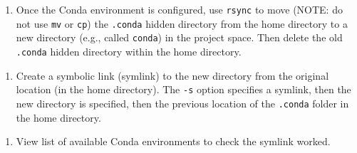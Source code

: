 \documentclass[]{book}
\newenvironment{Shaded}{\begin{snugshade}}{\end{snugshade}}
\newcommand{\StringTok}[1]{\textcolor[rgb]{0.31,0.60,0.02}{#1}}
\newcommand{\OperatorTok}[1]{\textcolor[rgb]{0.81,0.36,0.00}{\textbf{#1}}}
\newcommand{\ErrorTok}[1]{\textcolor[rgb]{0.64,0.00,0.00}{\textbf{#1}}}
\newcommand{\NormalTok}[1]{#1}
\providecommand{\tightlist}{%
  \setlength{\itemsep}{0pt}\setlength{\parskip}{0pt}}
\begin{document}
\begin{enumerate}
\def\labelenumi{\arabic{enumi}.}
\setcounter{enumi}{4}
\tightlist
\item
  Once the Conda environment is configured, use \texttt{rsync} to move
  (NOTE: do not use \texttt{mv} or \texttt{cp}) the \texttt{.conda}
  hidden directory from the home directory to a new directory (e.g.,
  called \texttt{conda}) in the project space. Then delete the old
  \texttt{.conda} hidden directory within the home directory.
\end{enumerate}

\begin{Shaded}
\end{Shaded}

\begin{enumerate}
\def\labelenumi{\arabic{enumi}.}
\setcounter{enumi}{5}
\tightlist
\item
  Create a symbolic link (symlink) to the new directory from the
  original location (in the home directory). The \texttt{-s} option
  specifies a symlink, then the new directory is specified, then the
  previous location of the \texttt{.conda} folder in the home directory.
\end{enumerate}

\begin{Shaded}
\end{Shaded}

\begin{enumerate}
\def\labelenumi{\arabic{enumi}.}
\setcounter{enumi}{6}
\tightlist
\item
  View list of available Conda environments to check the symlink worked.
\end{enumerate}
\end{document}
